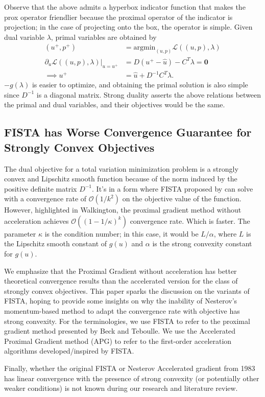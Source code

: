 \documentclass[]{article}
\theoremstyle{definition}
\numberwithin{equation}{subsection}
\begin{document}
        Observe that the above admits a hyperbox indicator function that makes the prox operator friendlier because the proximal operator of the indicator is projection; in the case of projecting onto the box, the operator is simple. 
        Given dual variable $\lambda$, primal variables are obtained by 
        \begin{align*}
            (u^+, p^+) &= \text{argmin}_{(u, p)} \mathcal L((u, p), \lambda) 
            \\
            \partial_u \mathcal L((u, p), \lambda)|_{u = u^+} &= D(u^+ - \hat u) - C^T\lambda = \mathbf 0
            \\
            \implies u^+ &= \hat u + D^{-1}C^T\lambda. 
        \end{align*}
        $-g(\lambda)$ is easier to optimize, and obtaining the primal solution is also simple since $D^{-1}$ is a diagonal matrix. 
        Strong duality asserts the above relations between the primal and dual variables, and their objectives would be the same. 
    \subsection{FISTA has Worse Convergence Guarantee for Strongly Convex Objectives}
        The dual objective for a total variation minimization problem is a strongly convex and Lipschitz smooth function because of the norm induced by the positive definite matrix $D^{-1}$. 
        It's in a form where FISTA proposed by \cite{beck_fast_2009-1} can solve with a convergence rate of $\mathcal O(1/k^2)$ on the objective value of the function. 
        However, highlighted in Walkington\cite{noel_nesterovs_nodate}, the proximal gradient method without acceleration achieves $\mathcal O\left((1 - 1/\kappa)^k\right)$ convergence rate. 
        Which is faster.
        The parameter $\kappa$ is the condition number; in this case, it would be $L/\alpha$, where $L$ is the Lipschitz smooth constant of $g(u)$ and $\alpha$ is the strong convexity constant for $g(u)$. 
        \par
        We emphasize that the Proximal Gradient without acceleration has better theoretical convergence results than the accelerated version for the class of strongly convex objectives. 
        This paper sparks the discussion on the variants of FISTA, hoping to provide some insights on why the inability of Nesterov's momentum-based method to adapt the convergence rate with objective has strong convexity. 
        For the terminologies, we use FISTA to refer to the proximal gradient method presented by Beck and Teboulle\cite{beck_fast_2009-1}. We use the Accelerated Proximal Gradient method (APG) to refer to the first-order acceleration algorithms developed/inspired by FISTA. 
        \par
        Finally, whether the original FISTA\cite{beck_fast_2009} or Nesterov Accelerated gradient from 1983 has linear convergence with the presence of strong convexity (or potentially other weaker conditions) is not known during our research and literature review. 
\end{document}
